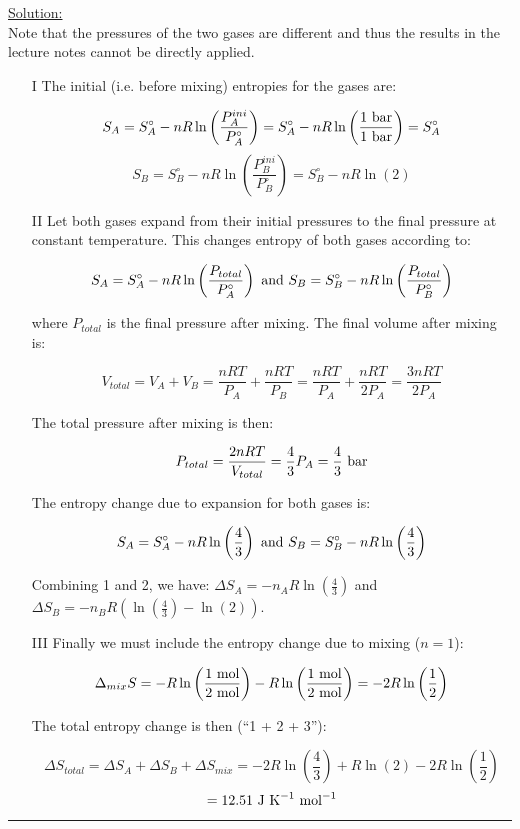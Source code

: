 \noindent
\underline{Solution:}\\

Note that the pressures of the two gases are different and thus the results in the lecture notes cannot be directly applied.

\begin{enumerate}

\item[I] The initial (i.e. before mixing) entropies for the gases are:

$$S_A = S_A^\circ - nR\ln\left(\frac{P_A^{ini}}{P_A^\circ}\right) = S_A^\circ - nR\ln\left(\frac{1\textnormal{ bar}}{1\textnormal{ bar}}\right) = S_A^\circ$$
$$S_B = S_B^\circ - nR\ln\left(\frac{P_B^{ini}}{P_B^\circ}\right) = S_B^\circ - nR\ln\left(2\right)$$

\item[II] Let both gases expand from their initial pressures to the final pressure at constant temperature. This changes entropy of both gases according to:

$$S_A = S_A^\circ - nR\ln\left(\frac{P_{total}}{P_A^\circ}\right)\textnormal{ and }S_B = S_B^\circ - nR\ln\left(\frac{P_{total}}{P_B^\circ}\right)$$

where $P_{total}$ is the final pressure after mixing. The final volume after mixing is:

$$V_{total} = V_A + V_B = \frac{nRT}{P_A} + \frac{nRT}{P_B} = \frac{nRT}{P_A} + \frac{nRT}{2P_A} = \frac{3nRT}{2P_A}$$

The total pressure after mixing is then:

$$P_{total} = \frac{2nRT}{V_{total}} = \frac{4}{3}P_A = \frac{4}{3}\textnormal{ bar}$$

The entropy change due to expansion for both gases is:

$$S_A = S_A^\circ - nR\ln\left(\frac{4}{3}\right)\textnormal{ and } S_B = S_B^\circ - nR\ln\left(\frac{4}{3}\right)$$

Combining 1 and 2, we have: $\Delta S_A = -n_AR\ln\left(\frac{4}{3}\right)$ and $\Delta S_B = -n_BR\left(\ln\left(\frac{4}{3}\right) - \ln(2)\right)$.

\item[III] Finally we must include the entropy change due to mixing ($n = 1$):

$$\Delta_{mix} S = -R\ln\left(\frac{1\textnormal{ mol}}{2\textnormal{ mol}}\right) - R\ln\left(\frac{1\textnormal{ mol}}{2\textnormal{ mol}}\right) = -2R\ln\left(\frac{1}{2}\right)$$

The total entropy change is then (``1 + 2 + 3''):

$$\Delta S_{total} = \Delta S_A + \Delta S_B + \Delta S_{mix} = -2R\ln\left(\frac{4}{3}\right) + R\ln(2) - 2R\ln\left(\frac{1}{2}\right)$$
$$ = 12.51\textnormal{ J K}^{-1}\textnormal{ mol}^{-1}$$

\end{enumerate}

\hrule\vspace{0.5cm}
